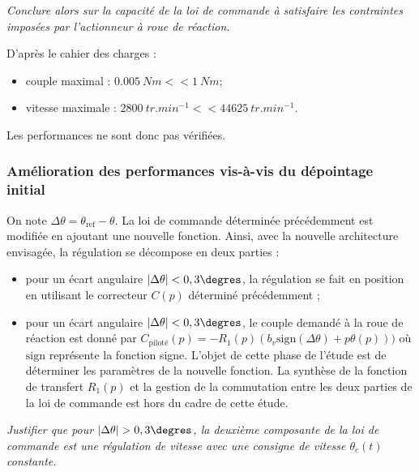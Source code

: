 \question{\label{q_27}}\textit{Conclure alors sur la capacité de la loi de commande à satisfaire les contraintes imposées par l’actionneur
à roue de réaction.}
\ifprof
\begin{corrige}
D'après le cahier des charges : 
\begin{itemize}
\item couple maximal : $\SI{0,005}{Nm} << \SI{1}{Nm}$;
\item vitesse maximale : $\SI{2800}{tr.min^{-1}} << \SI{44625}{tr.min^{-1}}$.
\end{itemize}

Les performances ne sont donc pas vérifiées.

\end{corrige}
\else
\fi

\subsubsection{\label{sec:3:D:2} Amélioration des performances vis-à-vis du dépointage initial}

\ifprof
\else

On note $\Delta \theta = \theta_{\text{ref}}-\theta$. La loi de commande déterminée précédemment est modifiée en ajoutant une nouvelle
fonction. Ainsi, avec la nouvelle architecture envisagée, la régulation se décompose en deux parties :
\begin{itemize}
\item pour un écart angulaire $|\Delta \theta|<0,3\degres$, la régulation se fait en position en utilisant le correcteur $C(p)$ déterminé
précédemment ;
\item pour un écart angulaire $|\Delta \theta|<0,3\degres$, le couple demandé à la roue de réaction est donné par $C_{\text{piloté}}(p)= -R_1(p)\left( b_v \text{sign}(\Delta \theta) + p\theta(p)\right))$ où $\text{sign}$ représente la fonction signe. L’objet de cette phase de l’étude est de
déterminer les paramètres de la nouvelle fonction. La synthèse de la fonction de transfert $R_1(p)$ et la gestion
de la commutation entre les deux parties de la loi de commande est hors du cadre de cette étude.
\end{itemize}
\fi


\question{\label{q_28}}\textit{Justifier que pour $|\Delta \theta|> 0,3 \degres$, la deuxième composante de la loi de commande est une régulation de
vitesse avec une consigne de vitesse $\dot{\theta}_c(t)$ constante.}
\ifprof
\begin{corrige}
\end{corrige}
\else
\fi


